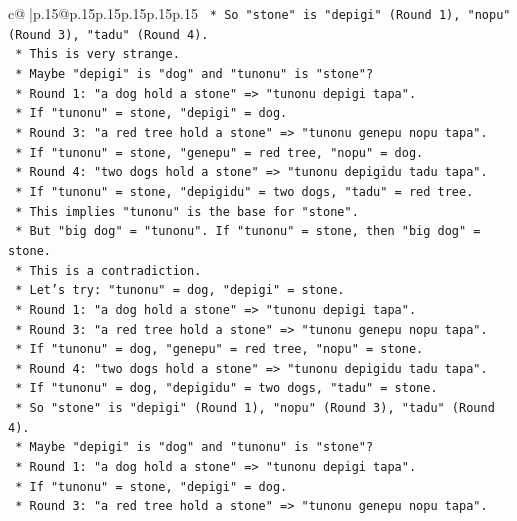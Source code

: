 \documentclass{article}
\begin{document}
{\begin{supertabular}{c@{$\;$}|p{.15\linewidth}@{}p{.15\linewidth}p{.15\linewidth}p{.15\linewidth}p{.15\linewidth}p{.15\linewidth}}
{{{\texttt{        *   So "stone" is "depigi" (Round 1), "nopu" (Round 3), "tadu" (Round 4).} \\
\texttt{        *   This is very strange.} \\
\texttt{        *   Maybe "depigi" is "dog" and "tunonu" is "stone"?} \\
\texttt{        *   Round 1: "a dog hold a stone" => "tunonu depigi tapa".} \\
\texttt{        *   If "tunonu" = stone, "depigi" = dog.} \\
\texttt{        *   Round 3: "a red tree hold a stone" => "tunonu genepu nopu tapa".} \\
\texttt{        *   If "tunonu" = stone, "genepu" = red tree, "nopu" = dog.} \\
\texttt{        *   Round 4: "two dogs hold a stone" => "tunonu depigidu tadu tapa".} \\
\texttt{        *   If "tunonu" = stone, "depigidu" = two dogs, "tadu" = red tree.} \\
\texttt{        *   This implies "tunonu" is the base for "stone".} \\
\texttt{        *   But "big dog" = "tunonu". If "tunonu" = stone, then "big dog" = stone.} \\
\texttt{        *   This is a contradiction.} \\
\texttt{        *   Let's try: "tunonu" = dog, "depigi" = stone.} \\
\texttt{        *   Round 1: "a dog hold a stone" => "tunonu depigi tapa".} \\
\texttt{        *   Round 3: "a red tree hold a stone" => "tunonu genepu nopu tapa".} \\
\texttt{        *   If "tunonu" = dog, "genepu" = red tree, "nopu" = stone.} \\
\texttt{        *   Round 4: "two dogs hold a stone" => "tunonu depigidu tadu tapa".} \\
\texttt{        *   If "tunonu" = dog, "depigidu" = two dogs, "tadu" = stone.} \\
\texttt{        *   So "stone" is "depigi" (Round 1), "nopu" (Round 3), "tadu" (Round 4).} \\
\texttt{        *   Maybe "depigi" is "dog" and "tunonu" is "stone"?} \\
\texttt{        *   Round 1: "a dog hold a stone" => "tunonu depigi tapa".} \\
\texttt{        *   If "tunonu" = stone, "depigi" = dog.} \\
\texttt{        *   Round 3: "a red tree hold a stone" => "tunonu genepu nopu tapa".} \\
}}}
\end{supertabular}}
\end{document}

